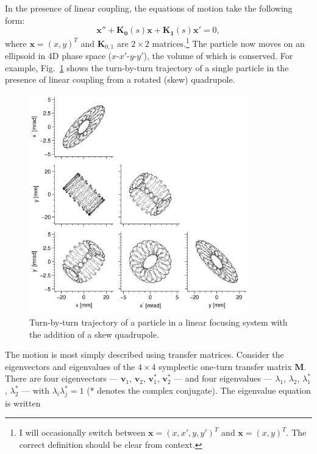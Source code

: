 In the presence of linear coupling, the equations of motion take the following form:
%
\begin{equation}\label{eq:single_particle_eom_coupled}
    \mathbf{x}'' + \mathbf{K_0}(s) \mathbf{x} + \mathbf{K_1}(s) \mathbf{x}' = 0,
\end{equation}
%
where $\mathbf{x} = (x, y)^T$ and $\mathbf{K}_{0, 1}$ are $2 \times 2$ matrices.\footnote{I will occasionally switch between $\mathbf{x} = (x, x', y, y')^T$ and $\mathbf{x} = (x, y)^T$. The correct definition should be clear from context.} The particle now moves on an ellipsoid in 4D phase space ($x$-$x'$-$y$-$y'$), the volume of which is conserved. For example, Fig.~\ref{fig:skew_quad_single_particle_tbt} shows the turn-by-turn trajectory of a single particle in the presence of linear coupling from a rotated (skew) quadrupole.
%
\begin{figure}[!p]
    \centering
    \includegraphics[width=0.85\textwidth]{Images/chapter1/skew_quad_single_particle_tbt.png}
    \caption{Turn-by-turn trajectory of a particle in a linear focusing system with the addition of a skew quadrupole.}
    \label{fig:skew_quad_single_particle_tbt}
\end{figure}
%
The motion is most simply described using transfer matrices. Consider the eigenvectors and eigenvalues of the $4 \times 4$ symplectic one-turn transfer matrix $\mathbf{M}$. There are four eigenvectors — $\mathbf{v}_1$, $\mathbf{v}_2$, $\mathbf{v}_1^*$, $\mathbf{v}_2^*$ — and four eigenvalues — $\lambda_1$, $\lambda_2$, $\lambda_1^*$, $\lambda_2^*$ — with $\lambda_i\lambda_j^* = 1$ (* denotes the complex conjugate). The eigenvalue equation is written
